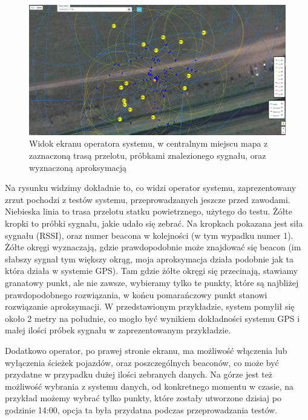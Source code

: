 \begin{figure}[!th]
    \centering
    \includegraphics[width=15cm]{zalaczniki/obrazy/klient.png}
    \caption{Widok ekranu operatora systemu, w centralnym miejscu mapa z zaznaczoną trasą przelotu, próbkami znalezionego sygnału, oraz wyznaczoną aproksymacją}
    \label{fig:klient}
\end{figure}

Na rysunku widzimy dokładnie to, co widzi operator systemu, zaprezentowany zrzut pochodzi z testów systemu, przeprowadzanych jeszcze przed zawodami. Niebieska linia to trasa przelotu statku powietrznego, użytego do testu. Żółte kropki to próbki sygnału, jakie udało się zebrać. Na kropkach pokazana jest siła sygnału (RSSI), oraz numer beacona w kolejności (w tym wypadku numer 1). Żółte okręgi wyznaczają, gdzie prawdopodobnie może znajdować się beacon (im słabszy sygnał tym większy okrąg, moja aproksymacja działa podobnie jak ta która działa w systemie GPS). Tam gdzie żółte okręgi się przecinają, stawiamy granatowy punkt, ale nie zawsze, wybieramy tylko te punkty, które są najbliżej prawdopodobnego rozwiązania, w końcu pomarańczowy punkt stanowi rozwiązanie aproksymacji. W przedstawionym przykładzie, system pomylił się około 2 metry na południe, co mogło być wynikiem dokładności systemu GPS i małej ilości próbek sygnału w zaprezentowanym przykładzie.

Dodatkowo operator, po prawej stronie ekranu, ma możliwość włączenia lub wyłączenia ścieżek pojazdów, oraz poszczególnych beaconów, co może być przydatne w przypadku dużej ilości zebranych danych. Na górze jest też możliwość wybrania z systemu danych, od konkretnego momentu w czasie, na przykład możemy wybrać tylko punkty, które zostały utworzone dzisiaj po godzinie 14:00, opcja ta była przydatna podczas przeprowadzania testów.

